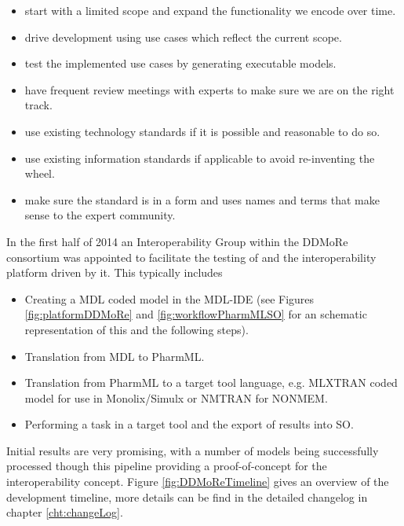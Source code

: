 
\begin{itemize}
\item start with a limited scope and expand the functionality we encode over time.
\item drive development using use cases which reflect the current scope.
\item test the implemented use cases by generating executable models.
\item have frequent review meetings with experts to make sure we are on the right track.
\item use existing technology standards if it is possible and reasonable to do so.
\item use existing information standards if applicable to avoid re-inventing the wheel.
\item make sure the standard is in a form and uses names and terms that make sense to the expert community.
\end{itemize}

In the first half of 2014 an Interoperability Group within the DDMoRe consortium 
was appointed to facilitate the testing of \pml and the interoperability platform driven 
by it. This typically includes 
\begin{itemize}
\item
Creating a MDL coded model in the MDL-IDE (see Figures \ref{fig:platformDDMoRe} 
and \ref{fig:workflowPharmMLSO} for an schematic representation of this and 
the following steps).
\item
Translation from MDL to PharmML.
\item
Translation from PharmML to a target tool language, e.g. MLXTRAN coded model 
for use in Monolix/Simulx or NMTRAN for NONMEM.
\item
Performing a task in a target tool and the export of results into SO.
\end{itemize}
Initial results are very promising, with a number of models being successfully processed 
though this pipeline providing a proof-of-concept for the interoperability concept. 
Figure \ref{fig:DDMoReTimeline} gives an overview of the development timeline, 
more details can be find in the detailed changelog in chapter \ref{cht:changeLog}.

